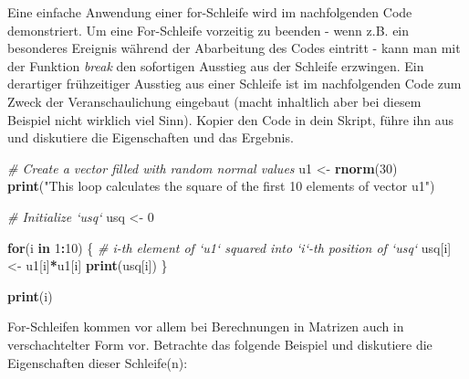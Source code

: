 \documentclass[]{article}
\newenvironment{Shaded}{\begin{snugshade}}{\end{snugshade}}
\newcommand{\KeywordTok}[1]{\textcolor[rgb]{0.13,0.29,0.53}{\textbf{#1}}}
\newcommand{\DecValTok}[1]{\textcolor[rgb]{0.00,0.00,0.81}{#1}}
\newcommand{\StringTok}[1]{\textcolor[rgb]{0.31,0.60,0.02}{#1}}
\newcommand{\CommentTok}[1]{\textcolor[rgb]{0.56,0.35,0.01}{\textit{#1}}}
\newcommand{\ControlFlowTok}[1]{\textcolor[rgb]{0.13,0.29,0.53}{\textbf{#1}}}
\newcommand{\OperatorTok}[1]{\textcolor[rgb]{0.81,0.36,0.00}{\textbf{#1}}}
\newcommand{\NormalTok}[1]{#1}
\begin{document}
Eine einfache Anwendung einer for-Schleife wird im nachfolgenden Code
demonstriert. Um eine For-Schleife vorzeitig zu beenden - wenn z.B. ein
besonderes Ereignis während der Abarbeitung des Codes eintritt - kann
man mit der Funktion \emph{break} den sofortigen Ausstieg aus der
Schleife erzwingen. Ein derartiger frühzeitiger Ausstieg aus einer
Schleife ist im nachfolgenden Code zum Zweck der Veranschaulichung
eingebaut (macht inhaltlich aber bei diesem Beispiel nicht wirklich viel
Sinn). Kopier den Code in dein Skript, führe ihn aus und diskutiere die
Eigenschaften und das Ergebnis.

\begin{Shaded}
\begin{Highlighting}[]
  \CommentTok{# Create a vector filled with random normal values}
\NormalTok{  u1 <-}\StringTok{ }\KeywordTok{rnorm}\NormalTok{(}\DecValTok{30}\NormalTok{)}
  \KeywordTok{print}\NormalTok{(}\StringTok{"This loop calculates the square of the first 10 elements of vector u1"}\NormalTok{)}
  
  \CommentTok{# Initialize `usq`}
\NormalTok{  usq <-}\StringTok{ }\DecValTok{0}
  
  \ControlFlowTok{for}\NormalTok{(i }\ControlFlowTok{in} \DecValTok{1}\OperatorTok{:}\DecValTok{10}\NormalTok{) \{}
    \CommentTok{# i-th element of `u1` squared into `i`-th position of `usq`}
\NormalTok{    usq[i] <-}\StringTok{ }\NormalTok{u1[i]}\OperatorTok{*}\NormalTok{u1[i]}
    \KeywordTok{print}\NormalTok{(usq[i])}
\NormalTok{  \}}
  
  \KeywordTok{print}\NormalTok{(i)  }
\end{Highlighting}
\end{Shaded}

For-Schleifen kommen vor allem bei Berechnungen in Matrizen auch in
verschachtelter Form vor. Betrachte das folgende Beispiel und diskutiere
die Eigenschaften dieser Schleife(n):
\end{document}
